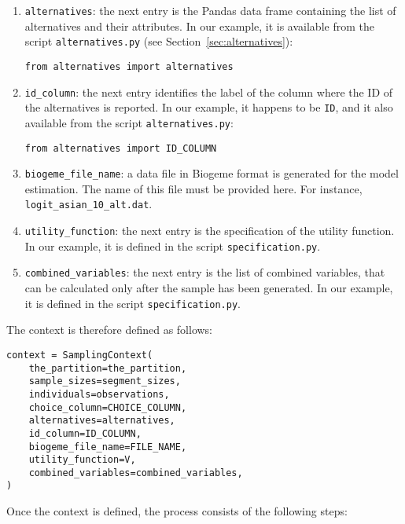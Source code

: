 \documentclass[12pt,a4paper]{article}
\begin{document}
\begin{enumerate}
\item \lstinline+alternatives+: the next entry is the Pandas data frame containing the list of alternatives and their attributes. In our example, it is available from the script \lstinline+alternatives.py+ (see Section~\ref{sec:alternatives}):
  \begin{lstlisting}
from alternatives import alternatives
  \end{lstlisting}
\item \lstinline+id_column+: the next entry identifies the label of the column where the ID of the alternatives is reported.  In our example, it happens to be \lstinline+ID+, and it also available from the script    \lstinline+alternatives.py+:
  \begin{lstlisting}
from alternatives import ID_COLUMN
  \end{lstlisting}
\item \lstinline+biogeme_file_name+: a data file in Biogeme format is generated for the model estimation. The name of this file must be provided here. For instance, \lstinline+logit_asian_10_alt.dat+.
\item \lstinline+utility_function+: the next entry is the specification of the utility function. In our example, it is defined in the script \lstinline+specification.py+.
\item \lstinline+combined_variables+: the next entry is the list of combined variables, that can be calculated only after the sample has been generated. In our example, it is defined in the script \lstinline+specification.py+.
\end{enumerate}

The context is therefore defined as follows:
\begin{lstlisting}
context = SamplingContext(
    the_partition=the_partition,
    sample_sizes=segment_sizes,
    individuals=observations,
    choice_column=CHOICE_COLUMN,
    alternatives=alternatives,
    id_column=ID_COLUMN,
    biogeme_file_name=FILE_NAME,
    utility_function=V,
    combined_variables=combined_variables,
)
\end{lstlisting}

Once the context is defined, the process consists of the following steps:
\end{document}
